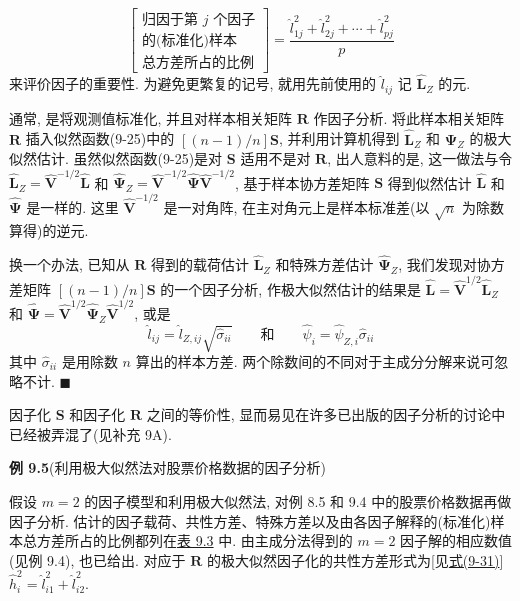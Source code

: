 
\label{eq:9-32}
\begin{equation}
\left[\begin{array}{c}
\text{归因于第 } j \text{ 个因子}\\
\text{的(标准化)样本}\\
\text{总方差所占的比例}
\end{array}\right]
=\frac{\hat{l}_{1j}^2+\hat{l}_{2j}^2+\cdots+\hat{l}_{pj}^2}{p}
\tag{9-32}
\end{equation}
来评价因子的重要性. 为避免更繁复的记号, 就用先前使用的 $\hat{l}_{ij}$ 记 $\hat{\mathbf{L}}_Z$ 的元.

\quad 通常, 是将观测值标准化, 并且对样本相关矩阵 $\mathbf{R}$ 作因子分析. 将此样本相关矩阵 $\mathbf{R}$ 插入似然函数(9-25)中的 $[(n-1)/n]\mathbf{S}$, 并利用计算机得到 $\hat{\mathbf{L}}_Z$ 和 $\hat{\boldsymbol{\Psi}}_Z$ 的极大似然估计. 虽然似然函数(9-25)是对 $\mathbf{S}$ 适用不是对 $\mathbf{R}$, 出人意料的是, 这一做法与令 $\hat{\mathbf{L}}_Z=\hat{\mathbf{V}}^{-1/2}\hat{\mathbf{L}}$ 和 $\hat{\boldsymbol{\Psi}}_Z=\hat{\mathbf{V}}^{-1/2}\hat{\boldsymbol{\Psi}}\hat{\mathbf{V}}^{-1/2}$, 基于样本协方差矩阵 $\mathbf{S}$ 得到似然估计 $\hat{\mathbf{L}}$ 和 $\hat{\boldsymbol{\Psi}}$ 是一样的. 这里 $\hat{\mathbf{V}}^{-1/2}$ 是一对角阵, 在主对角元上是样本标准差(以 $\sqrt{n}$ 为除数算得)的逆元.

换一个办法, 已知从 $\mathbf{R}$ 得到的载荷估计 $\hat{\mathbf{L}}_Z$ 和特殊方差估计 $\hat{\boldsymbol{\Psi}}_Z$, 我们发现对协方差矩阵 $[(n-1)/n]\mathbf{S}$ 的一个因子分析, 作极大似然估计的结果是 $\hat{\mathbf{L}}=\hat{\mathbf{V}}^{1/2}\hat{\mathbf{L}}_Z$ 和 $\hat{\boldsymbol{\Psi}}=\hat{\mathbf{V}}^{1/2}\hat{\boldsymbol{\Psi}}_Z\hat{\mathbf{V}}^{1/2}$, 或是
\[
\hat{l}_{ij}=\hat{l}_{Z,ij}\sqrt{\hat{\sigma}_{ii}}\qquad\text{和}\qquad
\hat{\psi}_i=\hat{\psi}_{Z,i}\hat{\sigma}_{ii}
\]
其中 $\hat{\sigma}_{ii}$ 是用除数 $n$ 算出的样本方差. 两个除数间的不同对于主成分分解来说可忽略不计. \hfill$\blacksquare$

因子化 $\mathbf{S}$ 和因子化 $\mathbf{R}$ 之间的等价性, 显而易见在许多已出版的因子分析的讨论中已经被弄混了(见补充 9A).

\noindent\textbf{例 9.5}\quad (利用极大似然法对股票价格数据的因子分析)

假设 $m=2$ 的因子模型和利用极大似然法, 对例 8.5 和 9.4 中的股票价格数据再做因子分析. 估计的因子载荷、共性方差、特殊方差以及由各因子解释的(标准化)样本总方差所占的比例都列在\hyperref[tab:9.3]{表 9.3} 中. 由主成分法得到的 $m=2$ 因子解的相应数值(见例 9.4), 也已给出. 对应于 $\mathbf{R}$ 的极大似然因子化的共性方差形式为[见\hyperref[eq:9-31]{式(9-31)}] $\hat{h}_i^2=\hat{l}_{i1}^2+\hat{l}_{i2}^2$.

